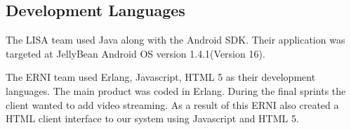 \subsection{Development Languages}

The LISA team used Java along with the Android SDK. Their application was targeted at JellyBean Android OS version 1.4.1(Version 16).

The ERNI team used Erlang, Javascript, HTML 5  as their development languages. The main product was coded in Erlang. During the final sprints the client wanted to add video streaming. As a result of this ERNI also created a HTML client interface to our system using Javascript and HTML 5. 
